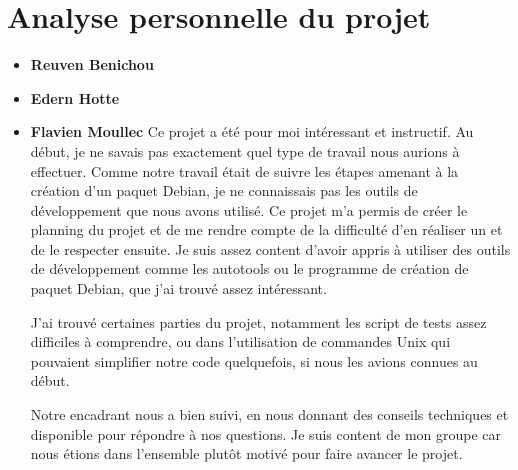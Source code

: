 \chapter{Analyse personnelle du projet}

\begin{itemize}
\item [\textbullet] \Large \textbf{Reuven Benichou}
\newline
\normalsize
\item [\textbullet] \Large \textbf{Edern Hotte}
\newline
\normalsize
\item [\textbullet] \Large \textbf{Flavien Moullec}
\newline
\normalsize
Ce projet a \'et\'e pour moi int\'eressant et instructif. Au d\'ebut, je ne savais pas exactement quel type de travail nous aurions \`a effectuer.
Comme notre travail \'etait de suivre les \'etapes amenant \`a la cr\'eation d'un paquet Debian, je ne connaissais pas les outils de
d\'eveloppement que nous avons utilis\'e. Ce projet m'a permis de cr\'eer le planning du projet et de me rendre compte de la difficult\'e d'en r\'ealiser un
et de le respecter ensuite. Je suis assez content d'avoir appris \`a utiliser des outils de d\'eveloppement comme les autotools ou le programme de cr\'eation de 
paquet Debian, que j'ai trouv\'e assez int\'eressant.

J'ai trouv\'e certaines parties du projet, notamment les script de tests assez difficiles \`a comprendre, ou dans l'utilisation de commandes Unix qui pouvaient
simplifier notre code quelquefois, si nous les avions connues au d\'ebut.

Notre encadrant nous a bien suivi, en nous donnant des conseils techniques et disponible pour r\'epondre \`a nos questions.
Je suis content de mon groupe car nous \'etions dans l'ensemble plut\^ot motiv\'e pour faire avancer le projet.


\end{itemize}
